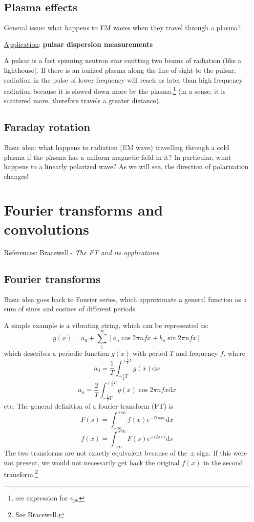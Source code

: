 \documentclass[12pt]{article}
\newcommand{\mar}[1]{\hspace{0pt}\marginpar{-\textcolor{black}{#1}-}}
\begin{document}
\subsection{Plasma effects}
\mar{60}General issue: what happens to EM waves when they travel through
a plasma?

\mar{61}

\mar{62}

\underline{Application}: \textbf{pulsar dispersion measurements}

A pulsar is a fast spinning neutron star emitting two beams of radiation
(like a lighthouse). If there is an ionized plasma along the line of sight
to the pulsar, radiation in the pulse of lower frequency will reach us later
than high frequency radiation because it is slowed down more by the
plasma.\footnote{
    see expression for $v_{ph}$}
(in a sense, it is scattered more, therefore travels a greater distance).

\subsection{Faraday rotation}
\mar{69}Basic idea: what happens to radiation (EM wave) travelling through
a cold plasma if the plasma has a uniform magnetic field in it?
In particular, what happens to a linearly polarized wave?
As we will see, the direction of polarization changes!

\newpage
\section{Fourier transforms and convolutions}
\mar{F1}References: Bracewell - \textit{The FT and its applications}
\subsection{Fourier transforms}
Basic idea goes back to Fourier series, which approximate a general function
as a sum of sines and cosines of different periods.

A simple example is a vibrating string, which can be represented as:
\[
    g(x) = a_{0} + \sum_{1}^{\infty} \left[
        a_{n}\cos{2 \pi nfx} + b_{n}\sin{2 \pi nfx} \right]
    \]
which describes a periodic function $g(x)$ with period $T$ and frequency $f$,
where
\[
    a_{0} = \frac{1}{T} \int_{-\frac{1}{2}T}^{+\frac{1}{2}T}{
        g(x) \mathrm{d}x}
    \]
\[
    a_{n} = \frac{2}{T} \int_{-\frac{1}{2}T}^{+\frac{1}{2}T}{
        g(x) \cos{2 \pi nfx} \mathrm{d}x}
    \]
etc. The general definition of a fourier transform (FT) is
\[
    F(s) = \int_{-\infty}^{+\infty}{
        f(x) e^{-i2{\pi}xs} \mathrm{d}x }
    \]
\[
    f(x) = \int_{-\infty}^{+\infty}{
        F(s) e^{+i2{\pi}xs} \mathrm{d}s }
    \]
The two transforms are not exactly equivalent because of the $\pm$ sign.
If this were not present, we would not necessarily get back the original
$f(x)$ in the second transform.\footnote{See Bracewell.}
\end{document}
